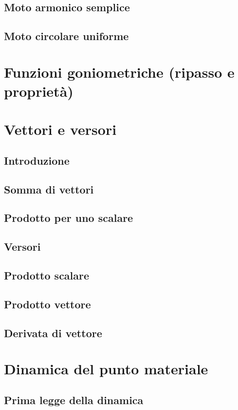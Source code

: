 \documentclass[a4paper]{article}
\begin{document}
\newpage

\subsection{Moto armonico semplice}
\subsection{Moto circolare uniforme}

\section{Funzioni goniometriche (ripasso e proprietà)}

\section{Vettori e versori}
\subsection{Introduzione}
\subsection{Somma di vettori}
\subsection{Prodotto per uno scalare}
\subsection{Versori}
\subsection{Prodotto scalare}
\subsection{Prodotto vettore}
\subsection{Derivata di vettore}

\newpage


\section{Dinamica del punto materiale}
\subsection{Prima legge della dinamica}
\end{document}

